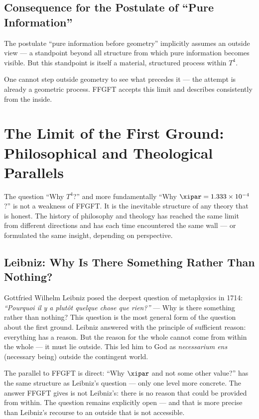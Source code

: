\subsection{Consequence for the Postulate of ``Pure Information''}

The postulate ``pure information before geometry'' implicitly assumes an outside view --- a standpoint beyond all structure from which pure information becomes visible. But this standpoint is itself a material, structured process within $T^4$.

One cannot step outside geometry to see what precedes it --- the attempt is already a geometric process. FFGFT accepts this limit and describes consistently from the inside.

\section{The Limit of the First Ground: Philosophical and Theological Parallels}

The question ``Why $T^4$?'' and more fundamentally ``Why $\xipar = 1.333 \times 10^{-4}$?'' is not a weakness of FFGFT. It is the inevitable structure of any theory that is honest. The history of philosophy and theology has reached the same limit from different directions and has each time encountered the same wall --- or formulated the same insight, depending on perspective.

\subsection{Leibniz: Why Is There Something Rather Than Nothing?}

Gottfried Wilhelm Leibniz posed the deepest question of metaphysics in 1714: \emph{``Pourquoi il y a plutôt quelque chose que rien?''} --- Why is there something rather than nothing? \cite{Leibniz1714} This question is the most general form of the question about the first ground. Leibniz answered with the principle of sufficient reason: everything has a reason. But the reason for the whole cannot come from within the whole --- it must lie outside. This led him to God as \emph{necessarium ens} (necessary being) outside the contingent world.

The parallel to FFGFT is direct: ``Why $\xipar$ and not some other value?'' has the same structure as Leibniz's question --- only one level more concrete. The answer FFGFT gives is not Leibniz's: there is no reason that could be provided from within. The question remains explicitly open --- and that is more precise than Leibniz's recourse to an outside that is not accessible.

